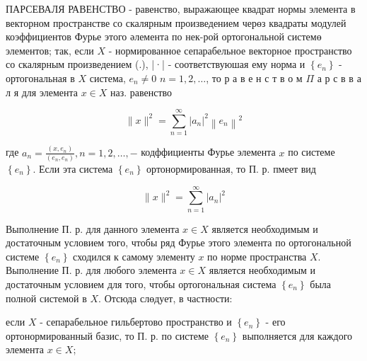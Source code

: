 \documentclass[10pt]{article}
\begin{document}
ПАРСЕВАЛЯ РАВЕНСТВО - равенство, выражающее квадрат нормы элемента в векторном пространстве со скалярным произведением черөз квадраты модулей коэффициентов Фурье этого әлемента по нек-рой ортогональной системө элементов; так, если $X$ - нормированное сепарабельное векторное пространство со скалярным произведением (.), |·| - соответствуюшая ему норма и $\left\{e_{n}\right\}$ - ортогональная в $X$ система, $e_{n} \neq 0$ $n=1,2, \ldots$, то р а в е н с т в о м $\Pi$ а р с в в а л я для элемента $x \in X$ наз. равенство



\[

\|x\|^{2}=\sum_{n=1}^{\infty}\left|a_{n}\right|^{2}\left\|e_{n}\right\|^{2}

\]



где $a_{n}=\frac{\left(x, e_{n}\right)}{\left(e_{n}, e_{n}\right)}, n=1,2, \ldots,-$ кодффициенты Фурье элемента $x$ по системе $\left\{e_{n}\right\}$. Если эта система $\left\{e_{n}\right\}$ ортонормированная, то П. р. пмеет вид



\[

\|x\|^{2}=\sum_{n=1}^{\infty}\left|a_{n}\right|^{2}

\]



Выполнение П. р. для данного элемента $x \in X$ является необходимым и достаточным условием того, чтобы ряд Фурье этого элемента по ортогональной системе $\left\{e_{n}\right\}$ сходился к самому элементу $x$ по норме пространства $X$. Выполнение П. р. для любого элемента $x \in X$ является необходимым и достаточным условием для того, чтобы ортогональная система $\left\{e_{n}\right\}$ была полной системой в $X$. Отсюда слөдует, в частности:



если $X$ - сепарабельное гильбертово пространство и $\left\{e_{n}\right\}$ - его ортонормированный базис, то П. р. по системе $\left\{e_{n}\right\}$ выполняется для каждого элемента $x \in X$;
\end{document}
